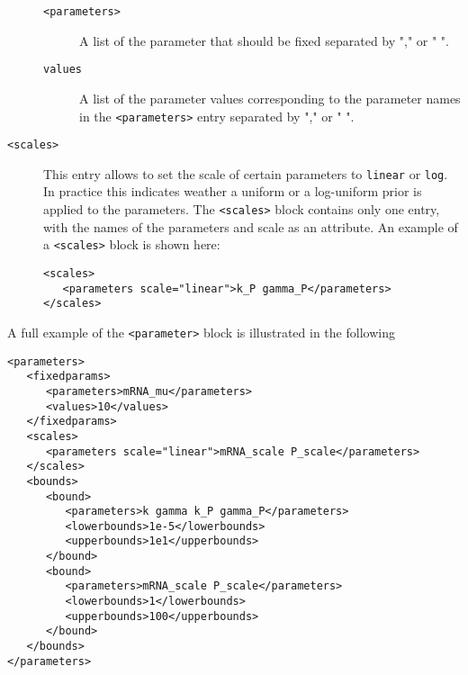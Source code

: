 \documentclass[11pt]{article} %
\begin{document}
\begin{description}
\begin{description}
			\item[\texttt{<parameters>}] A list of the parameter that should be fixed separated by "," or " ".
			\item[\texttt{values}] A list of the parameter values corresponding to the parameter names in the \texttt{<parameters>} entry separated by "," or " ".
		\end{description}
	\item[\texttt{<scales>}] This entry allows to set the scale of certain parameters to \texttt{linear} or \texttt{log}. In practice this indicates weather a uniform or a log-uniform prior is applied to the parameters. The \texttt{<scales>} block contains only one entry, with the names of the parameters and scale as an attribute.  An example of a \texttt{<scales>} block is shown here: 
\begin{tcolorbox}
\begin{verbatim}
<scales>
   <parameters scale="linear">k_P gamma_P</parameters>
</scales>
\end{verbatim}
\end{tcolorbox}
\end{description}

A full example of the \texttt{<parameter>} block is illustrated in the following

\begin{tcolorbox}
\begin{verbatim}
<parameters>
   <fixedparams>
      <parameters>mRNA_mu</parameters>
      <values>10</values>
   </fixedparams>
   <scales>
      <parameters scale="linear">mRNA_scale P_scale</parameters>
   </scales>
   <bounds>
      <bound>
         <parameters>k gamma k_P gamma_P</parameters>
         <lowerbounds>1e-5</lowerbounds>
         <upperbounds>1e1</upperbounds>
      </bound>
      <bound>
         <parameters>mRNA_scale P_scale</parameters>
         <lowerbounds>1</lowerbounds>
         <upperbounds>100</upperbounds>
      </bound>		
   </bounds>
</parameters>
\end{verbatim}
\end{tcolorbox}



\end{document}
